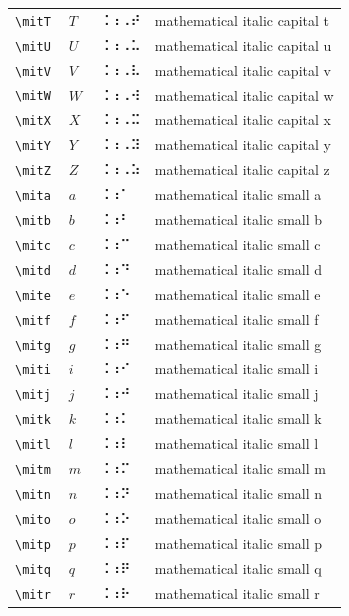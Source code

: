 \documentclass[oneside]{article}
\begin{document}
\begin{longtable}{llll}
\verb|\mitT| & $\mitT$ &  ⠨⠰⠠⠞  & {mathematical italic capital t} \\[2ex]
\verb|\mitU| & $\mitU$ &  ⠨⠰⠠⠥  & {mathematical italic capital u} \\[2ex]
\verb|\mitV| & $\mitV$ &  ⠨⠰⠠⠧  & {mathematical italic capital v} \\[2ex]
\verb|\mitW| & $\mitW$ &  ⠨⠰⠠⠺  & {mathematical italic capital w} \\[2ex]
\verb|\mitX| & $\mitX$ &  ⠨⠰⠠⠭  & {mathematical italic capital x} \\[2ex]
\verb|\mitY| & $\mitY$ &  ⠨⠰⠠⠽  & {mathematical italic capital y} \\[2ex]
\verb|\mitZ| & $\mitZ$ &  ⠨⠰⠠⠵  & {mathematical italic capital z} \\[2ex]
\verb|\mita| & $\mita$ &  ⠨⠰⠁  & {mathematical italic small a} \\[2ex]
\verb|\mitb| & $\mitb$ &  ⠨⠰⠃  & {mathematical italic small b} \\[2ex]
\verb|\mitc| & $\mitc$ &  ⠨⠰⠉  & {mathematical italic small c} \\[2ex]
\verb|\mitd| & $\mitd$ &  ⠨⠰⠙  & {mathematical italic small d} \\[2ex]
\verb|\mite| & $\mite$ &  ⠨⠰⠑  & {mathematical italic small e} \\[2ex]
\verb|\mitf| & $\mitf$ &  ⠨⠰⠋  & {mathematical italic small f} \\[2ex]
\verb|\mitg| & $\mitg$ &  ⠨⠰⠛  & {mathematical italic small g} \\[2ex]
\verb|\miti| & $\miti$ &  ⠨⠰⠊  & {mathematical italic small i} \\[2ex]
\verb|\mitj| & $\mitj$ &  ⠨⠰⠚  & {mathematical italic small j} \\[2ex]
\verb|\mitk| & $\mitk$ &  ⠨⠰⠅  & {mathematical italic small k} \\[2ex]
\verb|\mitl| & $\mitl$ &  ⠨⠰⠇  & {mathematical italic small l} \\[2ex]
\verb|\mitm| & $\mitm$ &  ⠨⠰⠍  & {mathematical italic small m} \\[2ex]
\verb|\mitn| & $\mitn$ &  ⠨⠰⠝  & {mathematical italic small n} \\[2ex]
\verb|\mito| & $\mito$ &  ⠨⠰⠕  & {mathematical italic small o} \\[2ex]
\verb|\mitp| & $\mitp$ &  ⠨⠰⠏  & {mathematical italic small p} \\[2ex]
\verb|\mitq| & $\mitq$ &  ⠨⠰⠟  & {mathematical italic small q} \\[2ex]
\verb|\mitr| & $\mitr$ &  ⠨⠰⠗  & {mathematical italic small r} \\[2ex]

\end{longtable}
\end{document}
